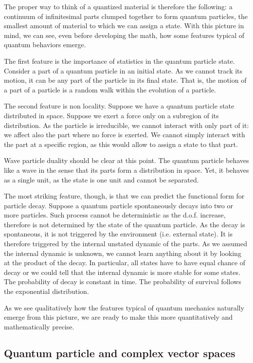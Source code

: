 \documentclass[aps,pra,10pt,twocolumn,floatfix,nofootinbib]{revtex4-1}
\numberwithin{equation}{section}
\theoremstyle{definition}
\begin{document}
The proper way to think of a quantized material is therefore the following: a continuum of infinitesimal parts clumped together to form quantum particles, the smallest amount of material to which we can assign a state. With this picture in mind, we can see, even before developing the math, how some features typical of quantum behaviors emerge.

The first feature is the importance of statistics in the quantum particle state. Consider a part of a quantum particle in an initial state. As we cannot track its motion, it can be any part of the particle in its final state. That is, the motion of a part of a particle is a random walk within the evolution of a particle.

The second feature is non locality. Suppose we have a quantum particle state distributed in space. Suppose we exert a force only on a subregion of its distribution. As the particle is irreducible, we cannot interact with only part of it: we affect also the part where no force is exerted. We cannot simply interact with the part at a specific region, as this would allow to assign a state to that part.

Wave particle duality should be clear at this point. The quantum particle behaves like a wave in the sense that its parts form a distribution in space. Yet, it behaves as a single unit, as the state is one unit and cannot be separated.

The most striking feature, though, is that we can predict the functional form for particle decay. Suppose a quantum particle spontaneously decays into two or more particles. Such process cannot be deterministic as the d.o.f. increase, therefore is not determined by the state of the quantum particle. As the decay is spontaneous, it is not triggered by the environment (i.e. external state). It is therefore triggered by the internal unstated dynamic of the parts. As we assumed the internal dynamic is unknown, we cannot learn anything about it by looking at the product of the decay. In particular, all states have to have equal chance of decay or we could tell that the internal dynamic is more stable for some states. The probability of decay is constant in time. The probability of survival follows the exponential distribution.

As we see qualitatively how the features typical of quantum mechanics naturally emerge from this picture, we are ready to make this more quantitatively and mathematically precise.

\subsection{Quantum particle and complex vector spaces}
\end{document}
